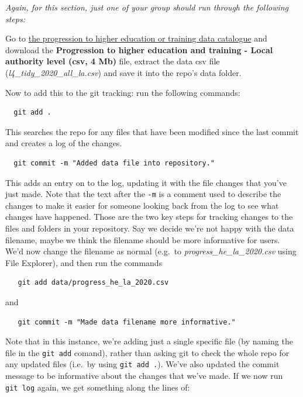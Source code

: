 \documentclass[
  12pt,
]{article}
\begin{document}
\emph{Again, for this section, just one of your group should run through
the following steps:}

Go to
\href{https://explore-education-statistics.service.gov.uk/data-catalogue/progression-to-higher-education-or-training/2019-20}{the
progression to higher education or training data catalogue} and download
the \textbf{Progression to higher education and training - Local
authority level (csv, 4 Mb)} file, extract the data csv file
(\emph{l4\_tidy\_2020\_all\_la.csv}) and save it into the repo's data
folder.

Now to add this to the git tracking: run the following commands:

\begin{verbatim}
  git add .
\end{verbatim}

This searches the repo for any files that have been modified since the
last commit and creates a log of the changes.

\begin{verbatim}
  git commit -m "Added data file into repository."
\end{verbatim}

This adds an entry on to the log, updating it with the file changes that
you've just made. Note that the text after the \texttt{-m} is a comment
used to describe the changes to make it easier for someone looking back
from the log to see what changes have happened. Those are the two key
steps for tracking changes to the files and folders in your repository.
Say we decide we're not happy with the data filename, maybe we think the
filename should be more informative for users. We'd now change the
filename as normal (e.g.~to \emph{progress\_he\_la\_2020.csv} using File
Explorer), and then run the commands

\begin{verbatim}
   git add data/progress_he_la_2020.csv
\end{verbatim}

and

\begin{verbatim}
   git commit -m "Made data filename more informative."
\end{verbatim}

Note that in this instance, we're adding just a single specific file (by
naming the file in the \texttt{git\ add} comand), rather than asking git
to check the whole repo for any updated files (i.e.~by using
\texttt{git\ add\ .}). We've also updated the commit message to be
informative about the changes that we've made. If we now run
\texttt{git\ log} again, we get something along the lines of:
\end{document}
